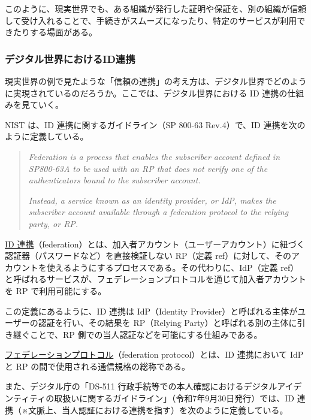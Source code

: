 \documentclass[uplatex]{jsarticle}
\def\ref#1{ref}%
\def\label#1{}%
\begin{document}
このように、現実世界でも、ある組織が発行した証明や保証を、別の組織が信頼して受け入れることで、手続きがスムーズになったり、特定のサービスが利用できたりする場面がある。

\subsubsection{デジタル世界におけるID連携}

現実世界の例で見たような「信頼の連携」の考え方は、デジタル世界でどのように実現されているのだろうか。ここでは、デジタル世界における ID 連携の仕組みを見ていく。

NIST は、ID 連携に関するガイドライン（SP 800-63 Rev.4）で、ID 連携を次のように定義している。

\begin{quote}
\textit{Federation is a process that enables the subscriber account defined in SP800-63A to be used with an RP that does not verify one of the authenticators bound to the subscriber account.}

\textit{Instead, a service known as an identity provider, or IdP, makes the subscriber account available through a federation protocol to the relying party, or RP.}
\end{quote}

\begin{dfn}\label{dfn:ch2b-federation-nist}
\underline{ID 連携}（federation）とは、加入者アカウント（ユーザーアカウント）に紐づく認証器（パスワードなど）を直接検証しない RP（定義 \ref{dfn:rp}）に対して、そのアカウントを使えるようにするプロセスである。その代わりに、IdP（定義 \ref{dfn:idp}）と呼ばれるサービスが、フェデレーションプロトコルを通じて加入者アカウントを RP で利用可能にする。
\end{dfn}

この定義にあるように、ID 連携は IdP（Identity Provider）と呼ばれる主体がユーザーの認証を行い、その結果を RP（Relying Party）と呼ばれる別の主体に引き継ぐことで、RP 側での当人認証などを可能にする仕組みである。

\begin{dfn}[フェデレーションプロトコル]\label{dfn:federation-protocol}
\underline{フェデレーションプロトコル}（federation protocol）とは、ID 連携において IdP と RP の間で使用される通信規格の総称である。
\end{dfn}

また、デジタル庁の「DS-511 行政手続等での本人確認におけるデジタルアイデンティティの取扱いに関するガイドライン」（令和7年9月30日発行）では、ID 連携（※文脈上、当人認証における連携を指す）を次のように定義している。
\end{document}
